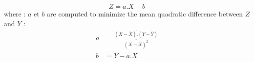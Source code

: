 \[
Z = a.X + b
\]
where : \newline
$a$ et $b$ are computed to minimize the mean quadratic
difference between $Z$ and $Y$ :
\begin{align*}
a &= \frac{\overline { (X - \overline{X}) . (Y - \overline{Y})} }
        {\overline {(X -\overline{X})^{2}} } \\
b &= \overline{Y} - a. \overline{X} \\
\end{align*}

